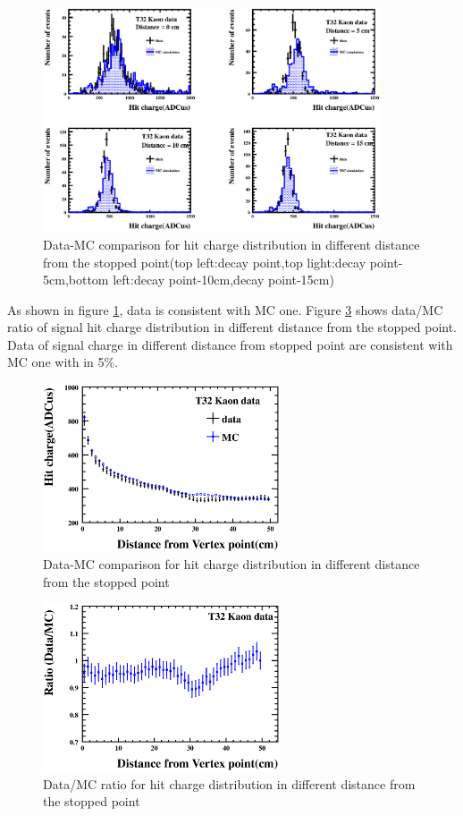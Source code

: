 \begin{figure}[!htb]
  \begin{center}
    \includegraphics[width=100mm]{fig/RangeVsHit4_wcut_hough.eps}
  \end{center}
  \caption{Data-MC comparison for hit charge distribution in different distance from the stopped point(top left:decay point,top light:decay point-5cm,bottom left:decay point-10cm,decay point-15cm)}
  \label{RangeVsHit_hough}
\end{figure}

As shown in figure \ref{RangeVsHit_hough}, data is consistent with MC one.
Figure \ref{RangeVsHitRatio_hough} shows data/MC ratio of signal hit charge distribution in different distance from the stopped point.
Data of signal charge in different distance from stopped point are consistent with MC one with in 5$\%$.

\begin{figure}[htb]
  \begin{center}
    \includegraphics[width=70mm]{fig/RangeVsHitfabs_wcut_hough.eps}
  \end{center}
  \caption{Data-MC comparison for hit charge distribution in different distance from the stopped point}
  \label{RangeVsHitfabs_hough}
\end{figure}

\begin{figure}[htb]
  \begin{center}
    \includegraphics[width=70mm]{fig/RangeVsHitRatio_wcut_hough.eps}
  \end{center}
  \caption{Data/MC ratio for hit charge distribution in different distance from the stopped point}
  \label{RangeVsHitRatio_hough}
\end{figure}



